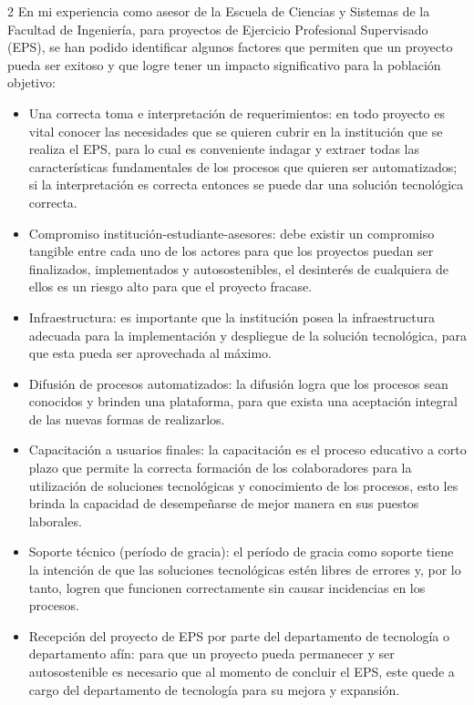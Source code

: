 \documentclass[11pt,spanish,Letterpaper,openany]{book}
\begin{document}
\begin {multicols}{2}
En mi experiencia como asesor de la Escuela de Ciencias y Sistemas de la Facultad de Ingeniería, para proyectos de Ejercicio Profesional Supervisado (EPS), se han podido identificar algunos factores que permiten que un proyecto pueda ser exitoso y que logre tener un impacto significativo para la población objetivo:

\begin{itemize}
\item
  Una correcta toma e interpretación de requerimientos: en todo proyecto es vital conocer las necesidades que se quieren cubrir en la institución que se realiza el EPS, para lo cual es conveniente indagar y extraer todas las características fundamentales de los procesos que quieren ser automatizados; si la interpretación es correcta entonces se puede dar una solución tecnológica correcta.
\item
  Compromiso institución-estudiante-asesores: debe existir un compromiso tangible entre cada uno de los actores para que los proyectos puedan ser finalizados, implementados y autosostenibles, el desinterés de cualquiera de ellos es un riesgo alto para que el proyecto fracase.
\item
  Infraestructura: es importante que la institución posea la infraestructura adecuada para la implementación y despliegue de la solución tecnológica, para que esta pueda ser aprovechada al máximo.
\item
  Difusión de procesos automatizados: la difusión logra que los procesos sean conocidos y brinden una plataforma, para que exista una aceptación integral de las nuevas formas de realizarlos.
\item
  Capacitación a usuarios finales: la capacitación es el proceso educativo a corto plazo que permite la correcta formación de los colaboradores para la utilización de soluciones tecnológicas y conocimiento de los procesos, esto les brinda la capacidad de desempeñarse de mejor manera en sus puestos laborales.
\item
  Soporte técnico (período de gracia): el período de gracia como soporte tiene la intención de que las soluciones tecnológicas estén libres de errores y, por lo tanto, logren que funcionen correctamente sin causar incidencias en los procesos.
\item
  Recepción del proyecto de EPS por parte del departamento de tecnología o departamento afín: para que un proyecto pueda permanecer y ser autosostenible es necesario que al momento de concluir el EPS, este quede a cargo del departamento de tecnología para su mejora y expansión.
\end{itemize}


\end{multicols}
\end{document}
